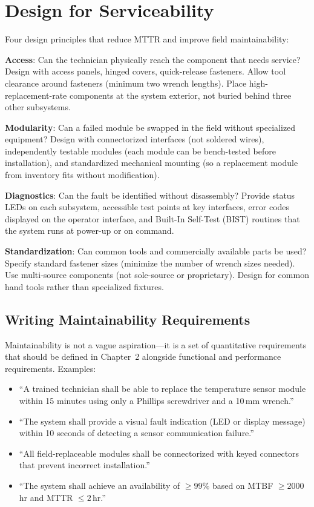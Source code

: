 \documentclass[11pt,letterpaper,twoside,openany]{book}
\begin{document}
\FloatBarrier
\section{Design for Serviceability}
Four design principles that reduce MTTR and improve field maintainability:

\textbf{Access}: Can the technician physically reach the component that needs service? Design with access panels, hinged covers, quick-release fasteners. Allow tool clearance around fasteners (minimum two wrench lengths). Place high-replacement-rate components at the system exterior, not buried behind three other subsystems.

\textbf{Modularity}: Can a failed module be swapped in the field without specialized equipment? Design with connectorized interfaces (not soldered wires), independently testable modules (each module can be bench-tested before installation), and standardized mechanical mounting (so a replacement module from inventory fits without modification).

\textbf{Diagnostics}: Can the fault be identified without disassembly? Provide status LEDs on each subsystem, accessible test points at key interfaces, error codes displayed on the operator interface, and Built-In Self-Test (BIST) routines that the system runs at power-up or on command.

\textbf{Standardization}: Can common tools and commercially available parts be used? Specify standard fastener sizes (minimize the number of wrench sizes needed). Use multi-source components (not sole-source or proprietary). Design for common hand tools rather than specialized fixtures.

\subsection{Writing Maintainability Requirements}
Maintainability is not a vague aspiration---it is a set of quantitative requirements that should be defined in Chapter~2 alongside functional and performance requirements. Examples:

\begin{itemize}[leftmargin=1.5em]
\item ``A trained technician shall be able to replace the temperature sensor module within 15 minutes using only a Phillips screwdriver and a 10\,mm wrench.''
\item ``The system shall provide a visual fault indication (LED or display message) within 10 seconds of detecting a sensor communication failure.''
\item ``All field-replaceable modules shall be connectorized with keyed connectors that prevent incorrect installation.''
\item ``The system shall achieve an availability of $\geq 99\%$ based on MTBF $\geq 2000$\,hr and MTTR $\leq 2$\,hr.''
\end{itemize}
\end{document}
